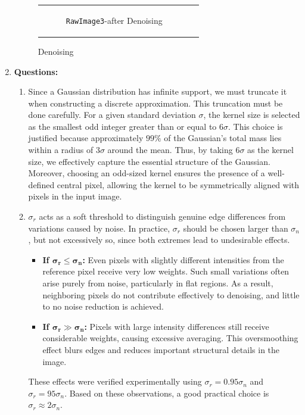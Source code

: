 \documentclass[11pt, a4]{article}
\begin{document}
\begin{enumerate}
\begin{figure}[H]
{\begin{tabular}{cc}
\begin{subfigure}[h]{0.45\linewidth}
						\caption{\texttt{RawImage3}-after Denoising}
						\label{fig:RawImage3_denoising_2}
						\end{subfigure}
					\end{tabular}
				}
				\caption{Denoising}
				\label{fig:RawImages_denosising}
			\end{figure}
			\item \textbf{Questions:}\\
			\begin{enumerate}[label=\arabic*., start=1]
				\item Since a Gaussian distribution has infinite support, we must truncate it when constructing a discrete approximation. This truncation must be done carefully. For a given standard deviation $\sigma$, the kernel size is selected as the smallest odd integer greater than or equal to $6\sigma$. This choice is justified because approximately $99\%$ of the Gaussian’s total mass lies within a radius of $3\sigma$ around the mean. Thus, by taking $6\sigma$ as the kernel size, we effectively capture the essential structure of the Gaussian. Moreover, choosing an odd-sized kernel ensures the presence of a well-defined central pixel, allowing the kernel to be symmetrically aligned with pixels in the input image.
				\item $\sigma_r$ acts as a soft threshold to distinguish genuine edge differences from variations caused by noise. In practice, $\sigma_r$ should be chosen larger than $\sigma_n$, but not excessively so, since both extremes lead to undesirable effects.  
				
				\begin{itemize}
					\item \textbf{If $\boldsymbol{\sigma_r \leq \sigma_n}$:}  
					Even pixels with slightly different intensities from the reference pixel receive very low weights. Such small variations often arise purely from noise, particularly in flat regions. As a result, neighboring pixels do not contribute effectively to denoising, and little to no noise reduction is achieved.  
					
					\item \textbf{If $\boldsymbol{\sigma_r \gg \sigma_n}$:}  
					Pixels with large intensity differences still receive considerable weights, causing excessive averaging. This oversmoothing effect blurs edges and reduces important structural details in the image.  
				\end{itemize}
				
				These effects were verified experimentally using $\sigma_r = 0.95\sigma_n$ and $\sigma_r = 95\sigma_n$.  
				Based on these observations, a good practical choice is $\sigma_r \approx 2\sigma_n$.  
				
			\end{enumerate}
		\end{enumerate}
\end{document}
